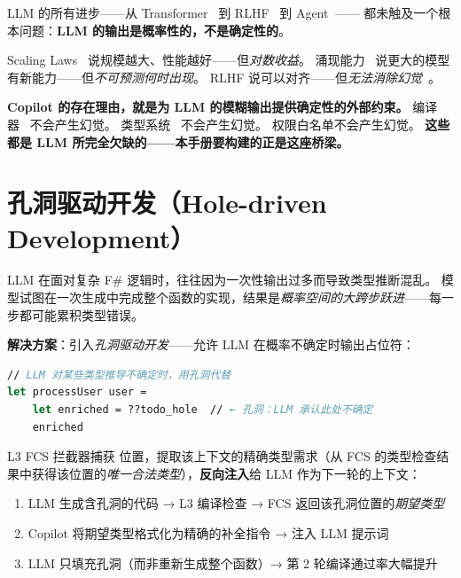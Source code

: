 \documentclass[10pt, openany]{book}
\begin{document}
\begin{principle}
LLM 的所有进步——从 Transformer~\cite{Vaswani2017Attention} 到 RLHF~\cite{Ouyang2022InstructGPT} 到 Agent~\cite{Yao2023ReAct}——
都未触及一个根本问题：\textbf{LLM 的输出是概率性的，不是确定性的}。

Scaling Laws~\cite{Kaplan2020Scaling,Hoffmann2022Chinchilla} 说规模越大、性能越好——但\emph{对数收益}。
涌现能力~\cite{Wei2022Emergent} 说更大的模型有新能力——但\emph{不可预测何时出现}。
RLHF 说可以对齐——但\emph{无法消除幻觉}~\cite{Kadavath2022SelfEvaluation}。

\textbf{Copilot 的存在理由，就是为 LLM 的模糊输出提供确定性的外部约束。}
编译器~\cite{Aho2006Compilers} 不会产生幻觉。
类型系统~\cite{Pierce2002TAPL} 不会产生幻觉。
权限白名单不会产生幻觉。
\textbf{这些都是 LLM 所完全欠缺的——本手册要构建的正是这座桥梁。}~\cite{Chen2024RPCFunctor}
\end{principle}

\section{孔洞驱动开发（Hole-driven Development）}

LLM 在面对复杂 F\# 逻辑时，往往因为一次性输出过多而导致类型推断混乱。
模型试图在一次生成中完成整个函数的实现，结果是\emph{概率空间的大跨步跃进}——每一步都可能累积类型错误。

\textbf{解决方案}：引入\emph{孔洞驱动开发}——允许 LLM 在概率不确定时输出占位符：

\begin{lstlisting}[language=FSharp]
// LLM 对某些类型推导不确定时，用孔洞代替
let processUser user =
    let enriched = ??todo_hole  // ← 孔洞：LLM 承认此处不确定
    enriched
\end{lstlisting}

L3 FCS 拦截器捕获  位置，提取该上下文的精确类型需求（从 FCS 的类型检查结果中获得该位置的\emph{唯一合法类型}），\textbf{反向注入}给 LLM 作为下一轮的上下文：

\begin{enumerate}
    \item LLM 生成含孔洞的代码 → L3 编译检查 → FCS 返回该孔洞位置的\emph{期望类型}
    \item Copilot 将期望类型格式化为精确的补全指令 → 注入 LLM 提示词
    \item LLM 只填充孔洞（而非重新生成整个函数）→ 第 2 轮编译通过率大幅提升
\end{enumerate}
\end{document}
